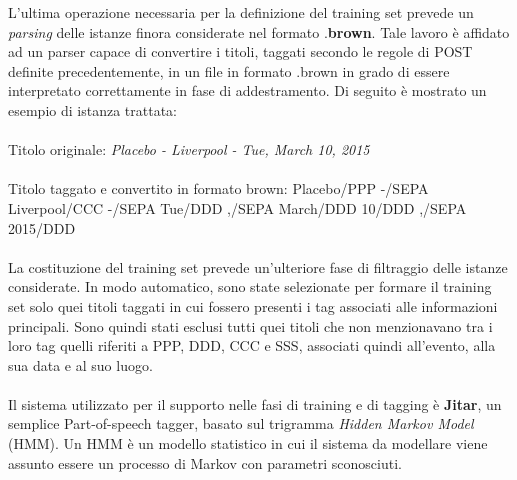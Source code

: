 \documentclass[a4paper]{report}
\begin{document}
L'ultima operazione necessaria per la definizione del training set prevede un \textit{parsing} delle istanze finora considerate nel formato .\textbf{brown}\cite{8}. Tale lavoro è affidato ad un parser capace di convertire i titoli, taggati secondo le regole di POST definite precedentemente, in un file in formato .brown in grado di essere interpretato correttamente in fase di addestramento. Di seguito è mostrato un esempio di istanza trattata: \\ \\
Titolo originale: \textit{Placebo - Liverpool - Tue, March 10, 2015} \\ \\
Titolo taggato e convertito in formato brown: Placebo/PPP -/SEPA Liverpool/CCC -/SEPA Tue/DDD ,/SEPA March/DDD 10/DDD ,/SEPA 2015/DDD \\ \\
La costituzione del training set prevede un'ulteriore fase di filtraggio delle istanze considerate. In modo automatico, sono state selezionate per formare il training set solo quei titoli taggati in cui fossero presenti i tag associati alle informazioni principali. Sono quindi stati esclusi tutti quei titoli che non menzionavano tra i loro tag quelli riferiti a PPP, DDD, CCC e SSS, associati quindi all'evento, alla sua data e al suo luogo. \\ \\
Il sistema utilizzato per il supporto nelle fasi di training e di tagging è \textbf{Jitar}\cite{9}, un semplice Part-of-speech tagger, basato sul trigramma \textit{Hidden Markov Model} (HMM). Un HMM è un modello statistico in cui il sistema da modellare viene assunto essere un processo di Markov con parametri sconosciuti. 
\end{document}
